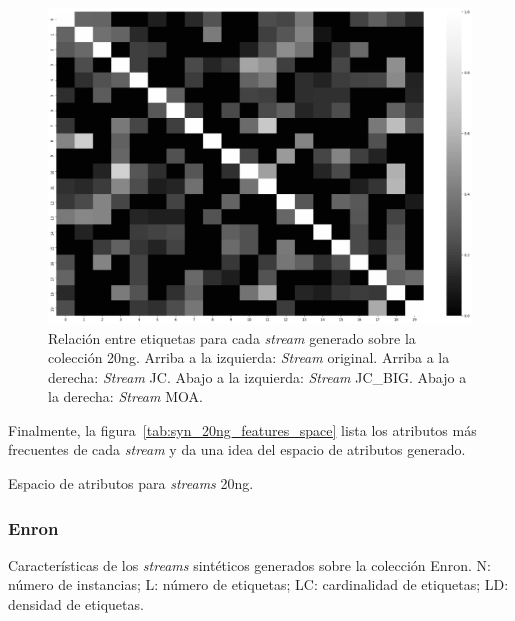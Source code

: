 \begin{figure}[htbp]
	\includegraphics[width=\linewidth / 2]{figures/experiments/syn/20ng/MOA_relationship_graph.png}
	\caption[Relación entre etiquetas para cada \textit{stream} generado sobre
		la colección 20ng.]{Relación entre etiquetas para cada \textit{stream} generado sobre
		la colección 20ng. Arriba a la izquierda: \textit{Stream} original. Arriba a la
		derecha: \textit{Stream} JC. Abajo a la izquierda: \textit{Stream}
		JC\_BIG. Abajo a la derecha: \textit{Stream} MOA.}
	\label{fig:syn_20ng_label_relationship}
\end{figure}

Finalmente, la figura~\ref{tab:syn_20ng_features_space} lista los atributos más
frecuentes de cada \textit{stream} y da una idea del espacio de atributos
generado.

\begin{table}[htbp]
	\centering
	\begin{adjustbox}{max width=\textwidth}
		
	\end{adjustbox}
	\caption{Espacio de atributos para \textit{streams} 20ng.}
	\label{tab:syn_20ng_features_space}
\end{table}

\subsubsection{Enron}

\begin{table}[htbp]
	\centering
	\begin{adjustbox}{max width=\textwidth}
		
	\end{adjustbox}
	\caption[Características de los \textit{streams} sintéticos generados sobre
		la colección Enron.]{Características de los \textit{streams} sintéticos generados sobre
		la colección Enron.  N: número de instancias; L: número de etiquetas; LC:
		cardinalidad de etiquetas; LD: densidad de etiquetas.}
	\label{tab:syn_enron_stats}
\end{table}

